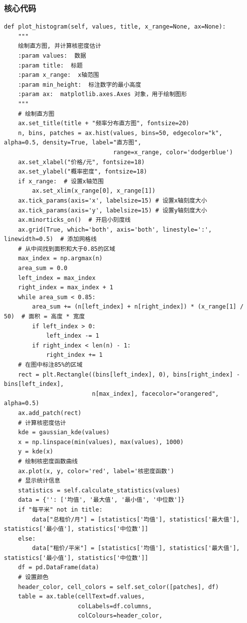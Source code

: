 \documentclass[lang=cn,11pt,a4paper]{elegantpaper}
\begin{document}
\subsubsection{核心代码}
\begin{lstlisting}
def plot_histogram(self, values, title, x_range=None, ax=None):
    """
    绘制直方图, 并计算核密度估计
    :param values:  数据
    :param title:  标题
    :param x_range:  x轴范围
    :param min_height:  标注数字的最小高度
    :param ax:  matplotlib.axes.Axes 对象，用于绘制图形
    """
    # 绘制直方图
    ax.set_title(title + "频率分布直方图", fontsize=20)
    n, bins, patches = ax.hist(values, bins=50, edgecolor="k", alpha=0.5, density=True, label="直方图",
                               range=x_range, color='dodgerblue')
    ax.set_xlabel("价格/元", fontsize=18)
    ax.set_ylabel("概率密度", fontsize=18)
    if x_range:  # 设置x轴范围
        ax.set_xlim(x_range[0], x_range[1])
    ax.tick_params(axis='x', labelsize=15) # 设置x轴刻度大小
    ax.tick_params(axis='y', labelsize=15) # 设置y轴刻度大小
    ax.minorticks_on()  # 开启小刻度线
    ax.grid(True, which='both', axis='both', linestyle=':', linewidth=0.5)  # 添加网格线
    # 从中间找到面积和大于0.85的区域
    max_index = np.argmax(n)
    area_sum = 0.0
    left_index = max_index
    right_index = max_index + 1
    while area_sum < 0.85:
        area_sum += (n[left_index] + n[right_index]) * (x_range[1] / 50)  # 面积 = 高度 * 宽度
        if left_index > 0:
            left_index -= 1
        if right_index < len(n) - 1:
            right_index += 1
    # 在图中标注85%的区域
    rect = plt.Rectangle((bins[left_index], 0), bins[right_index] - bins[left_index],
                         n[max_index], facecolor="orangered", alpha=0.5)
    ax.add_patch(rect)
    # 计算核密度估计
    kde = gaussian_kde(values)
    x = np.linspace(min(values), max(values), 1000)
    y = kde(x)
    # 绘制核密度函数曲线
    ax.plot(x, y, color='red', label='核密度函数')
    # 显示统计信息
    statistics = self.calculate_statistics(values)
    data = {'': ['均值', '最大值', '最小值', '中位数']}
    if "每平米" not in title:
        data["总租价/月"] = [statistics['均值'], statistics['最大值'], statistics['最小值'], statistics['中位数']]
    else:
        data["租价/平米"] = [statistics['均值'], statistics['最大值'], statistics['最小值'], statistics['中位数']]
    df = pd.DataFrame(data)
    # 设置颜色
    header_color, cell_colors = self.set_color([patches], df)
    table = ax.table(cellText=df.values,
                     colLabels=df.columns,
                     colColours=header_color,

\end{lstlisting}
\end{document}
